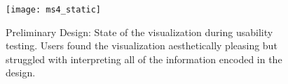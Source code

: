 \begin{figure}
\centering
\texttt{[image: ms4\_static]}
\caption{Preliminary Design: State of the visualization during usability testing. Users found the visualization aesthetically pleasing but struggled with interpreting all of the information encoded in the design.}
\label{fig:prelim_design}
\end{figure}